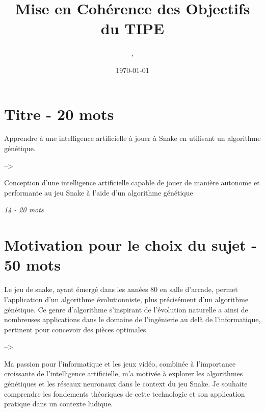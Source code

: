 \documentclass[11pt,a4paper]{article}
\author{\monNom, \maClasse}
\title{Mise en Cohérence des Objectifs du TIPE}
\date{\today}
\makeatletter
\renewcommand{\maketitle}{
  \thispagestyle{empty}
  \begin{center}
  \shadowbox{\parbox{5in}{%
     \centering%
     \textrm{\textbf{\Large \@title}}\\
     \vspace{0.2cm}
     \textrm{\large \@author}\\
     \vspace{0.2cm}
     \textrm{\large \@date}
  }} 
  \end{center}
  \null
}
\makeatother
\begin{document}
\maketitle

\tableofcontents

\thispagestyle{fancy}

\section{Titre - 20 mots}

\begin{center}
    Apprendre à une intelligence artificielle à jouer à Snake en utilisant un algorithme génétique.
    
    -->
    
    Conception d'une intelligence artificielle capable de jouer de manière autonome et performante au jeu Snake à l'aide d'un algorithme génétique
    
\end{center}

\textit{14 - 20 mots}

\section{Motivation pour le choix du sujet - 50 mots}


Le jeu de snake, ayant émergé dans les années 80 en salle d'arcade,
permet l'application d'un algorithme évolutionniste, 
plus précisément d'un algorithme génétique.
Ce genre d'algorithme s'inspirant de l'évolution naturelle a ainsi de 
nombreuses applications dans le domaine de l'ingénierie au delà de l'informatique, 
pertinent pour concevoir des pièces optimales.

-->

Ma passion pour l'informatique et les jeux vidéo, combinée à l'importance croissante de l'intelligence artificielle, m'a motivée à explorer les algorithmes génétiques et les réseaux neuronaux dans le context du jeu Snake.
Je souhaite comprendre les fondements théoriques de cette technologie et son application pratique dans un contexte ludique.

\end{document}
